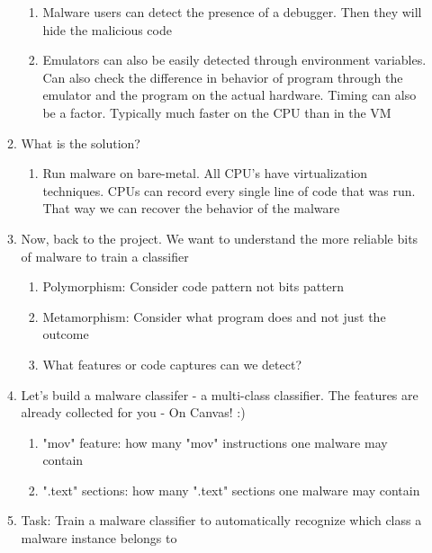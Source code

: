 \documentclass[a4paper, 11pt, oneside]{researchjournal} %
\begin{document}
\begin{enumerate}
\begin{enumerate}
\begin{enumerate}
             \item Malware users can detect the presence of a debugger. Then they will hide the malicious code
             \item Emulators can also be easily detected through environment variables. Can also check the difference in behavior of program through the emulator and the program on the actual hardware. Timing can also be a factor. Typically much faster on the CPU than in the VM
         \end{enumerate}
         \item What is the solution? 
         \begin{enumerate}
             \item Run malware on bare-metal. All CPU's have virtualization techniques. CPUs can record every single line of code that was run. That way we can recover the behavior of the malware 
         \end{enumerate}
         \item Now, back to the project. We want to understand the more reliable bits of malware to train a classifier
         \begin{enumerate}
             \item Polymorphism: Consider code pattern not bits pattern
             \item Metamorphism: Consider what program does and not just the outcome
             \item What features or code captures can we detect?
         \end{enumerate}
         \item Let's build a malware classifer - a multi-class classifier. The features are already collected for you - On Canvas! :) 
         \begin{enumerate}
             \item "mov" feature: how many "mov" instructions one malware may contain
             \item ".text" sections: how many ".text" sections one malware may contain
         \end{enumerate}
         \item Task: Train a malware classifier to automatically recognize which class a malware instance belongs to 
     \end{enumerate}


\end{enumerate}
\end{document}

